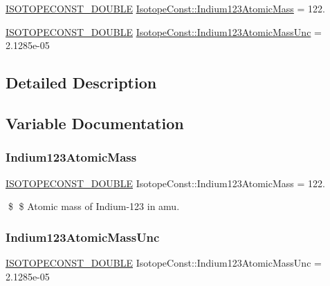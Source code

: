 \begin{DoxyCompactItemize}
\item 
\mbox{\hyperlink{group___isotope_const-_macros_ga8f45a7272ce02c0b4c65c44636ed719a}{I\+S\+O\+T\+O\+P\+E\+C\+O\+N\+S\+T\+\_\+\+D\+O\+U\+B\+LE}} \mbox{\hyperlink{group___isotope_const-_indium-_in123_ga2342debe833b4c59d38a610f92c27ead}{Isotope\+Const\+::\+Indium123\+Atomic\+Mass}} = 122.
\item 
\mbox{\hyperlink{group___isotope_const-_macros_ga8f45a7272ce02c0b4c65c44636ed719a}{I\+S\+O\+T\+O\+P\+E\+C\+O\+N\+S\+T\+\_\+\+D\+O\+U\+B\+LE}} \mbox{\hyperlink{group___isotope_const-_indium-_in123_gace532b2c95b55cd8b9e8d4e434ce3146}{Isotope\+Const\+::\+Indium123\+Atomic\+Mass\+Unc}} = 2.\+1285e-\/05
\end{DoxyCompactItemize}


\subsection{Detailed Description}


\subsection{Variable Documentation}
\mbox{\label{group___isotope_const-_indium-_in123_ga2342debe833b4c59d38a610f92c27ead}} 
\subsubsection{\texorpdfstring{Indium123\+Atomic\+Mass}{Indium123AtomicMass}}
{\footnotesize\ttfamily \mbox{\hyperlink{group___isotope_const-_macros_ga8f45a7272ce02c0b4c65c44636ed719a}{I\+S\+O\+T\+O\+P\+E\+C\+O\+N\+S\+T\+\_\+\+D\+O\+U\+B\+LE}} Isotope\+Const\+::\+Indium123\+Atomic\+Mass = 122.}

\$ \$ Atomic mass of Indium-\/123 in amu. \mbox{\label{group___isotope_const-_indium-_in123_gace532b2c95b55cd8b9e8d4e434ce3146}} 
\subsubsection{\texorpdfstring{Indium123\+Atomic\+Mass\+Unc}{Indium123AtomicMassUnc}}
{\footnotesize\ttfamily \mbox{\hyperlink{group___isotope_const-_macros_ga8f45a7272ce02c0b4c65c44636ed719a}{I\+S\+O\+T\+O\+P\+E\+C\+O\+N\+S\+T\+\_\+\+D\+O\+U\+B\+LE}} Isotope\+Const\+::\+Indium123\+Atomic\+Mass\+Unc = 2.\+1285e-\/05}

